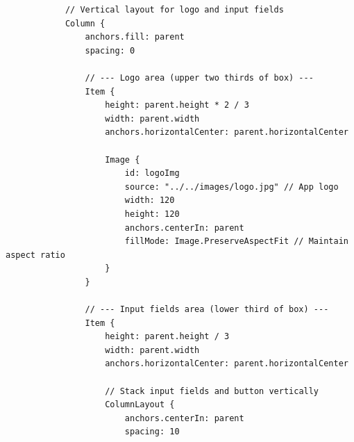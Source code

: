 \documentclass{report}
\begin{document}
\begin{lstlisting}
            // Vertical layout for logo and input fields
            Column {
                anchors.fill: parent
                spacing: 0

                // --- Logo area (upper two thirds of box) ---
                Item {
                    height: parent.height * 2 / 3
                    width: parent.width
                    anchors.horizontalCenter: parent.horizontalCenter

                    Image {
                        id: logoImg
                        source: "../../images/logo.jpg" // App logo
                        width: 120
                        height: 120
                        anchors.centerIn: parent
                        fillMode: Image.PreserveAspectFit // Maintain aspect ratio
                    }
                }

                // --- Input fields area (lower third of box) ---
                Item {
                    height: parent.height / 3
                    width: parent.width
                    anchors.horizontalCenter: parent.horizontalCenter

                    // Stack input fields and button vertically
                    ColumnLayout {
                        anchors.centerIn: parent
                        spacing: 10


\end{lstlisting}
\end{document}

